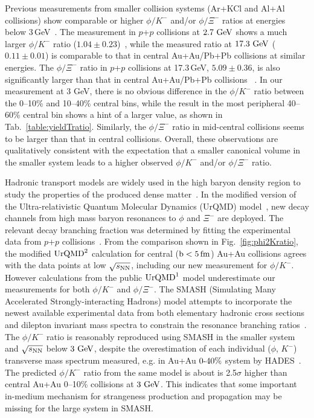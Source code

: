 \documentclass[aps,tightenlines,superscriptaddress,twocolumn]{revtex4-1}
\begin{document}
Previous measurements from smaller collision systems (Ar+KCl and Al+Al collisions) show comparable or higher $\phi/K^-$ and/or $\phi/\Xi^-$ ratios at energies below 3\,GeV~\cite{HADES_phi_ArKCl:2009,Xi_ArKCl_HADES:2009,FOPI_phi_NiNi:2015,FOPI_phi_AlAl:2016}. The measurement in $p$+$p$ collisions at $\textup{2.7 GeV}$ shows a much larger $\phi/K^-$ ratio ($1.04\pm0.23$)~\cite{ANKE_phi:2008}, while the measured ratio at $\textup{17.3 GeV}$ ($0.11\pm0.01$) is comparable to that in central Au+Au/Pb+Pb collisions at similar energies. The $\phi/\Xi^-$ ratio in $p$+$p$ collisions at 17.3\,GeV, $5.09\pm0.36$, is also significantly larger than that in central Au+Au/Pb+Pb collisions ~\cite{NA61SHINE_pp_piKp:2017,NA61SHINE_pp_phi:2020,NA61SHINE_pp_Xi:2020}. In our measurement at 3 GeV, there is no obvious difference in the $\phi/K^-$ ratio between the \textup{0--10\%} and \textup{10--40\%} central bins, while the result in the most peripheral 40--60\% central bin shows a hint of a larger value, as shown in Tab.~\ref{table:yieldTratio}. Similarly, the $\phi/\Xi^-$ ratio in mid-central collisions seems to be larger than that in central collisions. Overall, these observations are qualitatively consistent with the expectation that a smaller canonical volume in the smaller system leads to a higher observed $\phi/K^-$ and/or $\phi/\Xi^-$ ratio.


Hadronic transport models are widely used in the high baryon density region to study the properties of the produced dense matter~\cite{UrQMD_2:1998,urQMD:1999,Hartnack:2011cn,Steinheimer_2015_UrQMD,Elfner_SMASH:2019,Song:2020clw}. In the modified version of the Ultra-relativistic Quantum Molecular Dynamics (UrQMD) model~\cite{Steinheimer_2015_UrQMD}, new decay channels from high mass baryon resonances to $\phi$ and $\Xi^-$ are deployed. The relevant decay branching fraction was determined by fitting the experimental data from $p$+$p$ collisions~\cite{ANKE_phi:2008,pdg:2020}. From the comparison shown in Fig.~\ref{fig:phi2Kratio}, the modified $\textup{UrQMD}^{2}$ calculation for central ($\rm{b}<5\,\rm{fm}$) Au+Au collisions agrees with the data points at low ${\sqrt{s_{\rm NN}}}$, including our new measurement for $\phi/K^-$.
However calculations from the public $\textup{UrQMD}^{1}$ model underestimate our measurements for both $\phi/K^-$ and $\phi/\Xi^-$.   
The SMASH (Simulating Many Accelerated Strongly-interacting Hadrons) model attempts to incorporate the newest available experimental data from both elementary hadronic cross sections and dilepton invariant mass spectra to constrain the resonance branching ratios~\cite{Elfner_SMASH:2019}. The $\phi/K^-$ ratio is reasonably reproduced using SMASH in the smaller system and ${\sqrt{s_{\rm NN}}}$ below $\textup{3 GeV}$, despite the overestimation of each individual ($\phi$, $K^-$) transverse mass spectrum measured, e.g. in Au+Au $\textup{0-40\%}$ system by HADES~\cite{HADES_phi_AuAu:2018,Elfner_SMASH:2019}. The predicted $\phi/K^-$ ratio from the same model is about is 2.5$\sigma$ higher than central Au+Au 0--10\% collisions at $\textup{3 GeV}$. This indicates that some important in-medium mechanism for strangeness production and propagation may be missing for the large system in SMASH.
\end{document}
